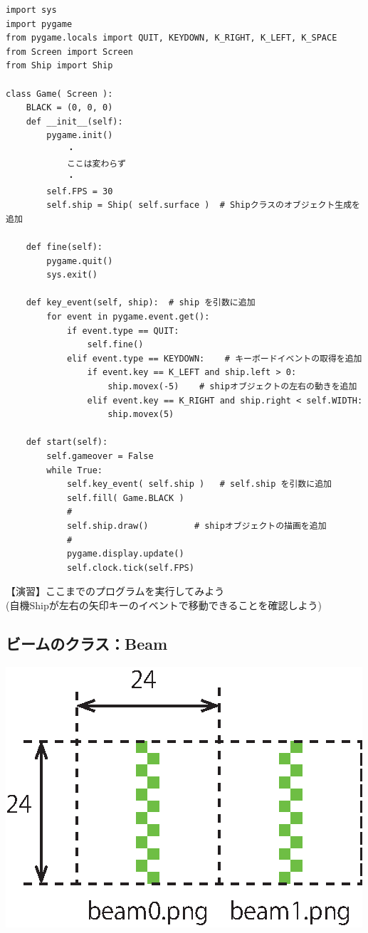 \documentclass[uplatex,a4paper,11pt,oneside,openany]{jsbook}
\begin{document}
\begin{lstlisting}[caption=Gameクラス（shipオブジェクトを追加）,label=p001-1]
import sys
import pygame
from pygame.locals import QUIT, KEYDOWN, K_RIGHT, K_LEFT, K_SPACE
from Screen import Screen
from Ship import Ship

class Game( Screen ):
    BLACK = (0, 0, 0)
    def __init__(self):
        pygame.init()
            ・
            ここは変わらず
            ・
        self.FPS = 30
        self.ship = Ship( self.surface )  # Shipクラスのオブジェクト生成を追加

    def fine(self):
        pygame.quit()
        sys.exit()

    def key_event(self, ship):  # ship を引数に追加
        for event in pygame.event.get():
            if event.type == QUIT:
                self.fine()
            elif event.type == KEYDOWN:    # キーボードイベントの取得を追加
                if event.key == K_LEFT and ship.left > 0:
                    ship.movex(-5)    # shipオブジェクトの左右の動きを追加
                elif event.key == K_RIGHT and ship.right < self.WIDTH:
                    ship.movex(5)

    def start(self):
        self.gameover = False
        while True:
            self.key_event( self.ship )   # self.ship を引数に追加
            self.fill( Game.BLACK )
            #
            self.ship.draw()         # shipオブジェクトの描画を追加
            #
            pygame.display.update()
            self.clock.tick(self.FPS)
\end{lstlisting}

【演習】ここまでのプログラムを実行してみよう\\(自機Shipが左右の矢印キーのイベントで移動できることを確認しよう)

\subsection{ビームのクラス：Beam}

\begin{center}
  \includegraphics[width=0.3\hsize]{figures/eps/beam0.eps}
\end{center}
\end{document}
